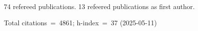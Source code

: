 74 refereed publications. 13 refeered publications as first author.

Total citations~=~4861; h-index~=~37 (2025-05-11)